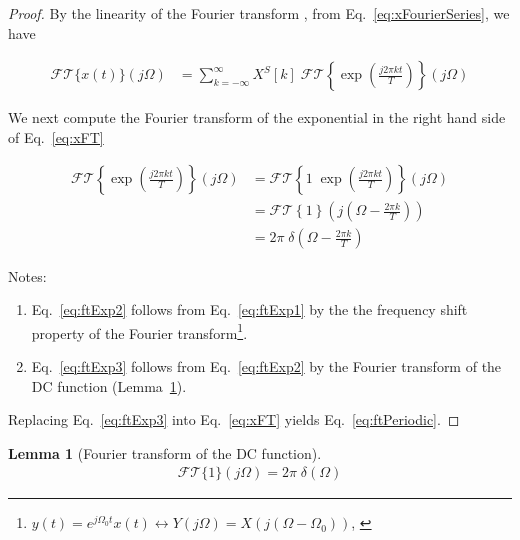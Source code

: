 \documentclass[12pt]{article}
\newtheorem{lemma}{Lemma}
\begin{document}
\begin{appendices}
\begin{proof}
        By the linearity of the Fourier transform \citep[][Eq. 2.4]{porat97}, from Eq.~\ref{eq:xFourierSeries},
        we have

        \begin{align}
            \mathcal{FT}\{x(t)\}(j\Omega)&=\sum_{k=-\infty}^\infty
            X^S[k]\;\mathcal{FT}\left\{\exp\left(\frac{j2\pi
            kt}{T}\right)\right\}(j\Omega)\label{eq:xFT}
        \end{align}

        We next compute the Fourier transform of the exponential in the right hand
        side of Eq.~\ref{eq:xFT}

        \begin{align}
            \mathcal{FT}\left\{\exp\left(\frac{j2\pi kt}{T}\right)\right\}(j\Omega)&=\mathcal{FT}\left\{1\; \exp\left(\frac{j2\pi kt}{T}\right)\right\}(j\Omega)\label{eq:ftExp1}\\
                                          &=\mathcal{FT}\left\{1\right\}\left(j\left(\Omega-\frac{2\pi k}{T}\right)\right)\label{eq:ftExp2}\\
                                          &=2\pi\;\delta\left(\Omega-\frac{2\pi k}{T}\right)\label{eq:ftExp3}
        \end{align}

        Notes:
        \begin{enumerate}

            \item Eq.~\ref{eq:ftExp2} follows from Eq.~\ref{eq:ftExp1} by the
                the frequency shift property of the Fourier
                transform\footnote{$y(t)=e^{j\Omega_0 t}x(t)\leftrightarrow
                Y(j\Omega)=X\left(j(\Omega-\Omega_0)\right)$, \citet[][Section
                2.1]{porat97}}.

            \item Eq.~\ref{eq:ftExp3} follows from Eq.~\ref{eq:ftExp2} by the
                Fourier transform of the DC function (Lemma~\ref{lemma:ftDC}).

        \end{enumerate}

        Replacing Eq.~\ref{eq:ftExp3} into Eq.~\ref{eq:xFT}
        yields Eq.~\ref{eq:ftPeriodic}.

    \end{proof}

    \begin{lemma}[Fourier transform of the DC function]
        \begin{align}
            \mathcal{FT}\{1\}(j\Omega)=2\pi\;\delta(\Omega)
        \end{align}
        \label{lemma:ftDC}
    \end{lemma}


\end{appendices}
\end{document}
